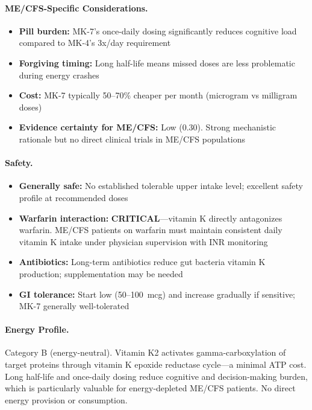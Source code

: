 \paragraph{ME/CFS-Specific Considerations.}
\begin{itemize}
    \item \textbf{Pill burden:} MK-7's once-daily dosing significantly reduces cognitive load compared to MK-4's 3x/day requirement
    \item \textbf{Forgiving timing:} Long half-life means missed doses are less problematic during energy crashes
    \item \textbf{Cost:} MK-7 typically 50--70\% cheaper per month (microgram vs milligram doses)
    \item \textbf{Evidence certainty for ME/CFS:} Low (0.30). Strong mechanistic rationale but no direct clinical trials in ME/CFS populations
\end{itemize}

\paragraph{Safety.}
\begin{itemize}
    \item \textbf{Generally safe:} No established tolerable upper intake level; excellent safety profile at recommended doses
    \item \textbf{Warfarin interaction:} \textbf{CRITICAL}---vitamin K directly antagonizes warfarin. ME/CFS patients on warfarin must maintain consistent daily vitamin K intake under physician supervision with INR monitoring
    \item \textbf{Antibiotics:} Long-term antibiotics reduce gut bacteria vitamin K production; supplementation may be needed
    \item \textbf{GI tolerance:} Start low (50--100~mcg) and increase gradually if sensitive; MK-7 generally well-tolerated
\end{itemize}

\paragraph{Energy Profile.}
Category B (energy-neutral). Vitamin K2 activates gamma-carboxylation of target proteins through vitamin K epoxide reductase cycle---a minimal ATP cost. Long half-life and once-daily dosing reduce cognitive and decision-making burden, which is particularly valuable for energy-depleted ME/CFS patients. No direct energy provision or consumption.

